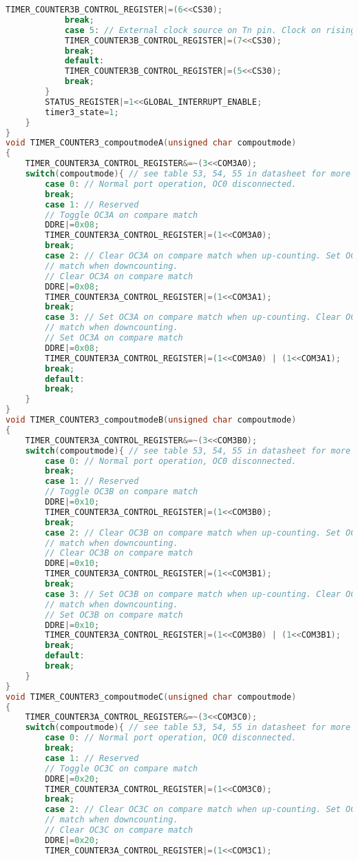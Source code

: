 \begin{lstlisting}[language=C, caption={atmega128timer.c}, label=atmega128timer-c, captionpos=b]
			TIMER_COUNTER3B_CONTROL_REGISTER|=(6<<CS30);
			break;
			case 5: // External clock source on Tn pin. Clock on rising edge
			TIMER_COUNTER3B_CONTROL_REGISTER|=(7<<CS30);
			break;
			default:
			TIMER_COUNTER3B_CONTROL_REGISTER|=(5<<CS30);
			break;
		}
		STATUS_REGISTER|=1<<GLOBAL_INTERRUPT_ENABLE;
		timer3_state=1;
	}	
}
void TIMER_COUNTER3_compoutmodeA(unsigned char compoutmode)
{
	TIMER_COUNTER3A_CONTROL_REGISTER&=~(3<<COM3A0);
	switch(compoutmode){ // see table 53, 54, 55 in datasheet for more information
		case 0: // Normal port operation, OC0 disconnected.
		break;
		case 1: // Reserved
		// Toggle OC3A on compare match
		DDRE|=0x08;
		TIMER_COUNTER3A_CONTROL_REGISTER|=(1<<COM3A0);
		break;
		case 2: // Clear OC3A on compare match when up-counting. Set OC0 on compare
		// match when downcounting.
		// Clear OC3A on compare match
		DDRE|=0x08;
		TIMER_COUNTER3A_CONTROL_REGISTER|=(1<<COM3A1);
		break;
		case 3: // Set OC3A on compare match when up-counting. Clear OC0 on compare
		// match when downcounting.
		// Set OC3A on compare match
		DDRE|=0x08;
		TIMER_COUNTER3A_CONTROL_REGISTER|=(1<<COM3A0) | (1<<COM3A1);
		break;
		default:
		break;
	}
}
void TIMER_COUNTER3_compoutmodeB(unsigned char compoutmode)
{
	TIMER_COUNTER3A_CONTROL_REGISTER&=~(3<<COM3B0);
	switch(compoutmode){ // see table 53, 54, 55 in datasheet for more information
		case 0: // Normal port operation, OC0 disconnected.
		break;
		case 1: // Reserved
		// Toggle OC3B on compare match
		DDRE|=0x10;
		TIMER_COUNTER3A_CONTROL_REGISTER|=(1<<COM3B0);
		break;
		case 2: // Clear OC3B on compare match when up-counting. Set OC0 on compare
		// match when downcounting.
		// Clear OC3B on compare match
		DDRE|=0x10;
		TIMER_COUNTER3A_CONTROL_REGISTER|=(1<<COM3B1);
		break;
		case 3: // Set OC3B on compare match when up-counting. Clear OC0 on compare
		// match when downcounting.
		// Set OC3B on compare match
		DDRE|=0x10;
		TIMER_COUNTER3A_CONTROL_REGISTER|=(1<<COM3B0) | (1<<COM3B1);
		break;
		default:
		break;
	}
}
void TIMER_COUNTER3_compoutmodeC(unsigned char compoutmode)
{
	TIMER_COUNTER3A_CONTROL_REGISTER&=~(3<<COM3C0);
	switch(compoutmode){ // see table 53, 54, 55 in datasheet for more information
		case 0: // Normal port operation, OC0 disconnected.
		break;
		case 1: // Reserved
		// Toggle OC3C on compare match
		DDRE|=0x20;
		TIMER_COUNTER3A_CONTROL_REGISTER|=(1<<COM3C0);
		break;
		case 2: // Clear OC3C on compare match when up-counting. Set OC0 on compare
		// match when downcounting.
		// Clear OC3C on compare match
		DDRE|=0x20;
		TIMER_COUNTER3A_CONTROL_REGISTER|=(1<<COM3C1);

\end{lstlisting}
